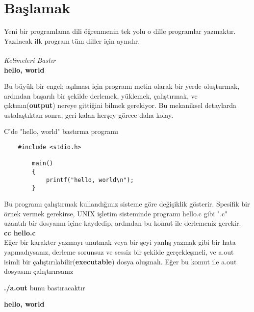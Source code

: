 \documentclass[a4paper,12pt,oneside]{book}
\begin{document}
\section{Başlamak}

Yeni bir programlama dili öğrenmenin tek yolu o dille programlar yazmaktır. Yazılacak ilk program tüm diller için aynıdır.
\\ \\ \hspace*{10mm} \textit{Kelimeleri Bastır}
\\ \hspace*{20mm} \textbf{hello, world} \\

\par Bu büyük bir engel; aşılması için programı metin olarak bir yerde oluşturmak, ardından başarılı bir şekilde derlemek, yüklemek, çalıştırmak, ve çıktının(\textbf{output}) nereye gittiğini bilmek gerekiyor. Bu mekaniksel detaylarda ustalaştıktan sonra, geri kalan herşey görece daha kolay.
    \par C'de "hello, world" bastırma programı
\begin{lstlisting}
    #include <stdio.h>

        main()
        {
            printf("hello, world\n");
        }
\end{lstlisting}

Bu programı çalıştırmak kullandığınız sisteme göre değişiklik gösterir. Spesifik bir örnek vermek gerekirse, UNIX işletim sisteminde programı hello.c gibi ".c" uzantılı bir dosyanın içine kaydedip, ardından bu komut ile derlemeniz gerekir. \\

\textbf{cc hello.c} \\

Eğer bir karakter yazmayı unutmak veya bir şeyi yanlış yazmak gibi bir hata yapmadıysanız, derleme sorunsuz ve sessiz bir şekilde gerçekleşmeli, ve a.out isimli bir çalıştırılabilir(\textbf{executable}) dosya oluşmalı. Eğer bu komut ile a.out dosyasını çalıştırırsanız \newline

\textbf{./a.out} \newline \newline
bunu bastıracaktır \newline
\par \textbf{hello, world} \newline
\end{document}
